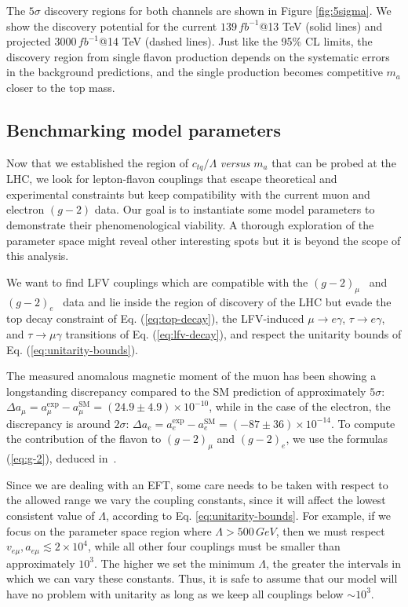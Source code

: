 \documentclass[prd,amsfonts,onecolumn,superscriptaddress,aps,nofootinbib,11pt]{revtex4-1}
\begin{document}
The $5\sigma$ discovery regions for both channels are shown in Figure \ref{fig:5sigma}. We show the discovery potential for the current $139 \, \si{fb^{-1}}$@13 TeV (solid lines) and projected $3000 \, \si{fb^{-1}}$@14 TeV (dashed lines). Just like the 95\% CL limits, the discovery region from single flavon production depends on the systematic errors in the background predictions, and the single production becomes competitive $m_a$ closer to the top mass.

\subsection{Benchmarking model parameters}

Now that we established the region of $c_{tq}/\Lambda$ {\it versus} $m_a$ that can be probed at the LHC, we look for lepton-flavon couplings that escape theoretical and experimental constraints but keep compatibility with the current muon and electron $(g-2)$ data. Our goal is to instantiate some model parameters to demonstrate their phenomenological viability. A thorough exploration of the parameter space might reveal other interesting spots but it is beyond the scope of this analysis.

We want to find  LFV couplings which are compatible with the $(g-2)_\mu$~\cite{Muong-2:2006rrc,Muong-2:2015xgu,Muong-2:2023cdq} and $(g-2)_e$~\cite{Hanneke_2008,Hanneke:2010au} data and lie inside the region of discovery of the LHC but evade the top decay constraint of Eq. (\ref{eq:top-decay}), the LFV-induced $\mu\to e\gamma$, $\tau\to e\gamma$, and $\tau\to \mu\gamma$  transitions of Eq. (\ref{eq:lfv-decay}), and respect the unitarity bounds of Eq. (\ref{eq:unitarity-bounds}).

The measured anomalous magnetic moment of the muon has been showing a longstanding discrepancy compared to the SM prediction of approximately $5\sigma$: $\Delta a_\mu = a_\mu^{\mathrm{exp}}-a_\mu^{\mathrm{SM}}=(24.9 \pm 4.9)\times 10^{-10}$, while in the case of the electron, the discrepancy is around $2\sigma$: $\Delta a_e = a_e^{\mathrm{exp}}-a_e^{\mathrm{SM}}=(-87\pm 36)\times 10^{-14}$. To compute the contribution of the flavon to $(g-2)_\mu$ and $(g-2)_e$, we use the formulas (\ref{eq:g-2}), deduced in~\cite{Cornella:2019uxs}.

Since we are dealing with an EFT, some care needs to be taken with respect to the allowed range we vary the coupling constants, since it will affect the lowest consistent value of $\Lambda$, according to Eq. \eqref{eq:unitarity-bounds}. For example, if we focus on the parameter space region where $\Lambda > 500 \, \si{GeV}$, then we must respect $v_{e \mu}, a_{e \mu} \lesssim 2\times 10^4$, while all other four couplings must be smaller than approximately $10^3$. The higher we set the minimum $\Lambda$, the greater the intervals in which we can vary these constants. Thus, it is safe to assume that our model will have no problem with unitarity as long as we keep all couplings below $\sim 10^3$.
\end{document}
